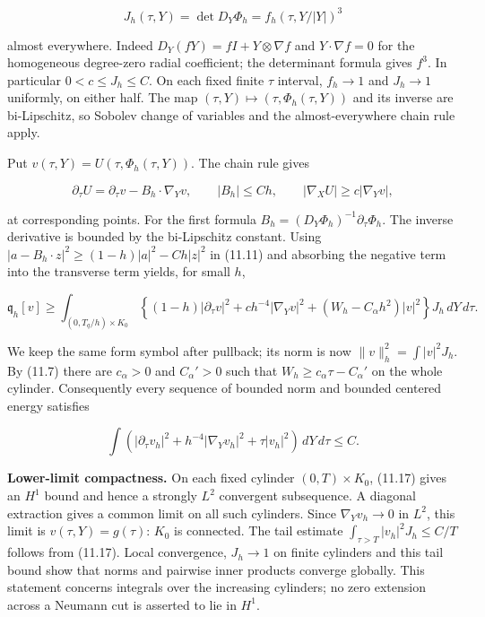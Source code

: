 \documentclass[11pt]{article}
\begin{document}
\[
J_h(\tau,Y)=\det D_Y\Phi_h=f_h(\tau,Y/|Y|)^3
\tag{11.14}
\]

almost everywhere. Indeed \(D_Y(fY)=fI+Y\otimes\nabla f\) and
\(Y\cdot\nabla f=0\) for the homogeneous degree-zero radial coefficient;
the determinant formula gives \(f^3\). In particular
\(0<c\le J_h\le C\). On each fixed finite \(\tau\) interval, \(f_h\to1\)
and \(J_h\to1\) uniformly, on either half. The map
\((\tau,Y)\mapsto(\tau,\Phi_h(\tau,Y))\) and its inverse are
bi-Lipschitz, so Sobolev change of variables and the almost-everywhere
chain rule apply.

Put \(v(\tau,Y)=U(\tau,\Phi_h(\tau,Y))\). The chain rule gives

\[
\partial_\tau U=\partial_\tau v-B_h\cdot\nabla_Yv,
\qquad |B_h|\le Ch,
\qquad |\nabla_XU|\ge c|\nabla_Yv|,
\tag{11.15}
\]

at corresponding points. For the first formula
\(B_h=(D_Y\Phi_h)^{-1}\partial_\tau\Phi_h\). The inverse derivative is
bounded by the bi-Lipschitz constant. Using
\(|a-B_h\cdot z|^2\ge(1-h)|a|^2-Ch|z|^2\) in (11.11) and absorbing the
negative term into the transverse term yields, for small \(h\),

\[
\mathfrak q_h[v]\ge
\int_{(0,T_q/h)\times K_0}
\left\{(1-h)|\partial_\tau v|^2+
 c h^{-4}|\nabla_Yv|^2+
 (W_h-C_\alpha h^2)|v|^2\right\}J_h\,dY\,d\tau.
\tag{11.16}
\]

We keep the same form symbol after pullback; its norm is now
\(\|v\|_h^2=\int|v|^2J_h\). By (11.7) there are \(c_\alpha>0\) and
\(C_\alpha'>0\) such that \(W_h\ge c_\alpha\tau-C_\alpha'\) on the whole
cylinder. Consequently every sequence of bounded norm and bounded
centered energy satisfies

\[
\int\left(|\partial_\tau v_h|^2+h^{-4}|\nabla_Yv_h|^2
 +\tau|v_h|^2\right)\,dY\,d\tau\le C.
\tag{11.17}
\]

\textbf{Lower-limit compactness.} On each fixed cylinder
\((0,T)\times K_0\), (11.17) gives an \(H^1\) bound and hence a strongly
\(L^2\) convergent subsequence. A diagonal extraction gives a common
limit on all such cylinders. Since \(\nabla_Yv_h\to0\) in \(L^2\), this
limit is \(v(\tau,Y)=g(\tau)\): \(K_0\) is connected. The tail estimate
\(\int_{\tau>T}|v_h|^2J_h\le C/T\) follows from (11.17). Local
convergence, \(J_h\to1\) on finite cylinders and this tail bound show
that norms and pairwise inner products converge globally. This statement
concerns integrals over the increasing cylinders; no zero extension
across a Neumann cut is asserted to lie in \(H^1\).
\end{document}
